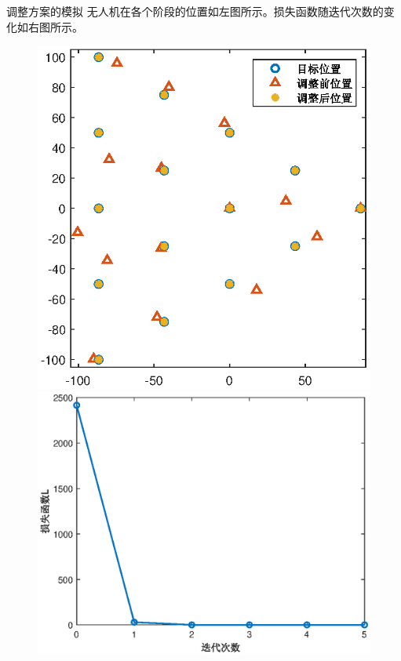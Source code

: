\documentclass[aspectratio=169]{beamer}
\begin{document}
\begin{frame}{调整方案的模拟}
    无人机在各个阶段的位置如左图所示。损失函数随迭代次数的变化如右图所示。
    \begin{figure}[!ht]
        \centering
        \begin{minipage}[t]{0.43\textwidth}
            \centering
            \includegraphics[width=\textwidth]{图片/无人机位置对比_锥形.eps}
        \end{minipage}
        \begin{minipage}[t]{0.55\textwidth}
            \centering
            \includegraphics[width=\textwidth]{图片/损失函数变化_锥形.eps}
        \end{minipage}
    \end{figure}
\end{frame}
\end{document}
